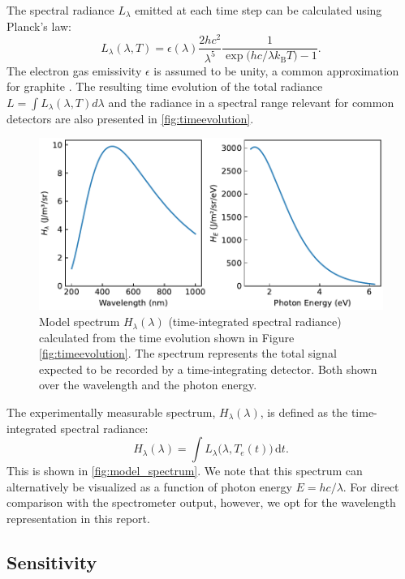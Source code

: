 \documentclass[
	a4paper,
]{scrarticle}
\begin{document}
The spectral radiance $L_\lambda$ emitted at each time step can be calculated using Planck's law:
\begin{equation}
    L_\lambda(\lambda,T)
    = \epsilon(\lambda) \frac{2hc^{2}}{\lambda^{5}}
    \frac{1}{\exp\bigl(hc / \lambda k_{\mathrm B}T\bigr)-1}.
\end{equation}
The electron gas emissivity $\epsilon$ is assumed to be unity, a common approximation for graphite \cite{sapritskyBlackbodyRadiometry1995}. The resulting time evolution of the total radiance $L=\int L_\lambda(\lambda, T) d\lambda$ and the radiance in a spectral range relevant for common detectors are also presented in \autoref{fig:timeevolution}.

\begin{figure}
    \centering
    \includegraphics{../analysis/figures/model.spectrum.pdf}
    \caption{Model spectrum $H_\lambda(\lambda)$ (time-integrated spectral radiance) calculated from the time evolution shown in Figure \ref{fig:timeevolution}. The spectrum represents the total signal expected to be recorded by a time-integrating detector. Both shown over the wavelength and the photon energy.}
    \label{fig:model_spectrum}
\end{figure}

The experimentally measurable spectrum, $H_\lambda(\lambda)$, is defined as the time-integrated spectral radiance:
\begin{equation}
      H_\lambda(\lambda) = 
      \int L_\lambda\bigl(\lambda, T_e(t)\bigr)\,\mathrm dt.
\end{equation}
This is shown in \autoref{fig:model_spectrum}. We note that this spectrum can alternatively be visualized as a function of photon energy $E = h c / \lambda$. For direct comparison with the spectrometer output, however, we opt for the wavelength representation in this report.

\subsection{Sensitivity}
\end{document}

